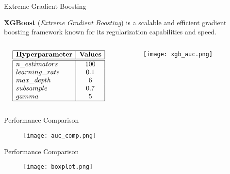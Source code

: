 \begin{frame}{Extreme Gradient Boosting}

    \textbf{XGBoost} (\textit{Extreme Gradient Boosting}) is a scalable and efficient gradient boosting framework known for its regularization capabilities and speed.

    \begin{columns}
        \begin{column}{0.45\textwidth}
            {\small
            $$
            \begin{array}{|l|c|}
                \hline
                \textbf{Hyperparameter} & \textbf{Values} \\
                \hline
                \hline
                n\_estimators & 100 \\
                learning\_rate & 0.1 \\
                max\_depth & 6 \\
                subsample & 0.7 \\
                gamma & 5 \\
                \hline
            \end{array}
            $$
            }
        \end{column}
        \begin{column}{0.55\textwidth}
            \begin{figure}
                \centering
                \vfill
                \texttt{[image: xgb\_auc.png]}
            \end{figure}
        \end{column}
    \end{columns}
\end{frame}

\begin{frame}{Performance Comparison}

    \begin{figure}
        \centering
        \vfill
        \texttt{[image: auc\_comp.png]}
    \end{figure}

\end{frame}

\begin{frame}{Performance Comparison}

    \begin{figure}
        \centering
        \vfill
        \texttt{[image: boxplot.png]}
    \end{figure}

\end{frame}
